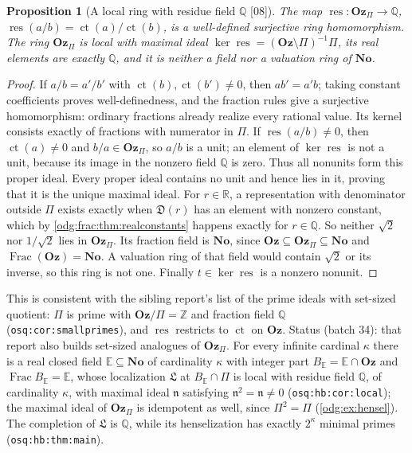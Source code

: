 \documentclass[11pt,oneside]{article}
\numberwithin{equation}{section}
\newtheorem{proposition}[proposition]{Proposition}
\theoremstyle{definition}
\theoremstyle{remark}
\newcommand{\No}{\mathbf{No}}
\newcommand{\Oz}{\mathbf{Oz}}
\newcommand{\Z}{\mathbb Z}
\newcommand{\Q}{\mathbb Q}
\newcommand{\R}{\mathbb R}
\newcommand{\ct}{\operatorname{ct}}
\newcommand{\Frac}{\operatorname{Frac}}
\newcommand{\src}[1]{\textup{\textsf{\small[#1]}}}
\newcommand{\replabel}[1]{\nolinkurl{#1}}
\newcommand{\Den}{\mathfrak D}
\newcommand{\res}{\operatorname{res}}
\begin{document}
\begin{proposition}[A local ring with residue field $\Q$ \src{08}]\label{odg:frac:prop:localization}
The map $\res:\Oz_\Pi\to\Q$, $\res(a/b)=\ct(a)/\ct(b)$, is a well-defined
surjective ring homomorphism. The ring $\Oz_\Pi$ is local with maximal ideal
$\ker\res=(\Oz\setminus\Pi)^{-1}\Pi$, its real elements are exactly $\Q$, and it
is neither a field nor a valuation ring of $\No$.
\end{proposition}
\begin{proof}
If $a/b=a'/b'$ with $\ct(b),\ct(b')\ne0$, then $ab'=a'b$; taking constant
coefficients proves well-definedness, and the fraction rules give a surjective
homomorphism: ordinary fractions already realize every rational value.
Its kernel consists exactly of fractions with numerator in $\Pi$.
If $\res(a/b)\ne0$, then $\ct(a)\ne0$ and $b/a\in\Oz_\Pi$, so $a/b$
is a unit; an element of $\ker\res$ is not a unit, because its image in
the nonzero field $\Q$ is zero. Thus all nonunits form this proper ideal.
Every proper ideal contains no unit and hence lies in it, proving that it
is the unique maximal ideal. For $r\in\R$, a
representation with denominator outside $\Pi$ exists exactly when $\Den(r)$ has
an element with nonzero constant, which by \cref{odg:frac:thm:realconstants}
happens exactly for $r\in\Q$. So neither $\sqrt2$ nor $1/\sqrt2$ lies in
$\Oz_\Pi$. Its fraction field is $\No$, since
$\Oz\subseteq\Oz_\Pi\subseteq\No$ and $\Frac(\Oz)=\No$. A valuation ring
of that field would contain $\sqrt2$ or its inverse, so this ring is not one. Finally $t\in\ker\res$ is a nonzero nonunit.
\end{proof}

This is consistent with the sibling report's list of the prime ideals with
set-sized quotient: $\Pi$ is prime with $\Oz/\Pi=\Z$ and fraction field $\Q$
(\replabel{osq:cor:smallprimes}), and $\res$ restricts to $\ct$ on $\Oz$.
Status (batch 34): that report also builds set-sized analogues of $\Oz_\Pi$.
For every infinite cardinal $\kappa$ there is a real closed field
$\mathbb E\subseteq\No$ of cardinality $\kappa$ with integer part
$B_{\mathbb E}=\mathbb E\cap\Oz$ and $\Frac B_{\mathbb E}=\mathbb E$, whose
localization $\mathfrak L$ at $B_{\mathbb E}\cap\Pi$ is local with residue
field $\Q$, of cardinality $\kappa$, with maximal ideal $\mathfrak n$
satisfying $\mathfrak n^2=\mathfrak n\ne0$ (\replabel{osq:hb:cor:local}); the
maximal ideal of $\Oz_\Pi$ is idempotent as well, since $\Pi^2=\Pi$
(\cref{odg:ex:hensel}). The completion of $\mathfrak L$ is $\Q$, while its
henselization has exactly $2^\kappa$ minimal primes
(\replabel{osq:hb:thm:main}).
\end{document}
